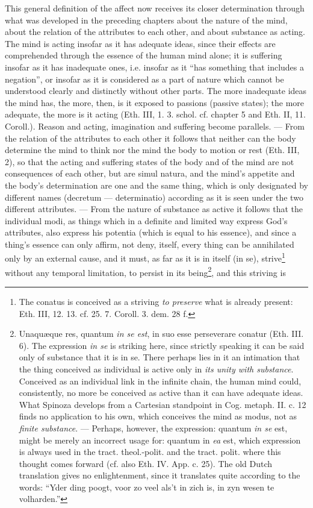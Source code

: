 \documentclass[12pt,a4paper,openany]{book}
\newcommand{\opage}[1]{\marginnote{\footnotesize\textit{[#1]}}}
\begin{document}
This general definition of the affect now receives its
closer determination through what was developed in the preceding chapters
about the nature of the mind, about the relation of the attributes
to each other, and about substance as acting. The mind
is acting insofar as it has adequate ideas, since
their effects are comprehended through the essence of the human
mind alone; it is suffering insofar as it has inadequate ones,
i.e. insofar as it ``has something that includes a negation'', or
insofar as it is considered as a part of nature which
cannot be understood clearly and distinctly without other parts. The
\opage{112}\setcounter{footnote}{0}more inadequate ideas the mind has, the more, then, is it
exposed to passions (passive states); the more adequate,
the more is it acting (Eth. III, 1. 3. schol. cf.
chapter 5 and Eth. II, 11. Coroll.). Reason and acting, imagination
and suffering become parallels. --- From the relation
of the attributes to each other it follows that neither can the body determine
the mind to think nor the mind the body to motion
or rest (Eth. III, 2), so that the acting and suffering states of the body
and of the mind are not consequences of each other,
but are simul natura, and the mind's appetite and the body's
determination are one and the same thing, which is only designated by
different names (decretum --- determinatio) according as it
is seen under the two different attributes. --- From the nature of
substance as active it follows that the individual modi, as things which
in a definite and limited way express God's
attributes, also express his potentia (which is equal to his
essence), and since a thing's essence can only affirm, not
deny, itself, every thing can be annihilated only by
an external cause, and it must, as far as it is in itself (in se),
strive\footnote{The conatus is conceived as a striving \emph{to
preserve} what is already present: Eth. III, 12. 13. cf.
25. 7. Coroll. 3. dem. 28 f.} without any temporal limitation, to %
persist in its
being\footnote{Unaquæque res, quantum \emph{in se est}, in
suo esse perseverare conatur (Eth. III. 6). The expression \emph{in
se} is striking here, since strictly speaking it can be said only of
substance that it is in se. There perhaps lies in it an
intimation that the thing conceived as individual is active only in \emph{its
unity with substance}. Conceived as an individual link in
the infinite chain, the human mind could, consistently,
no more be conceived as active than it can have
adequate ideas. What Spinoza develops from a Cartesian standpoint
in Cog. metaph. II. c. 12 finds no application to
his own, which conceives the mind as modus, not as
\emph{finite substance}. --- Perhaps, however, the expression:
quantum \emph{in se} est, might be merely an incorrect usage for:
quantum in \emph{ea} est, which expression is always used in the tract.
theol.-polit. and the tract. polit. where this thought comes forward
(cf. also Eth. IV. App. c. 25). The old Dutch
translation gives no enlightenment, since it translates
quite according to the words: ``Yder ding poogt, voor zo veel als't in
zich is, in zyn wesen te volharden.''}, and this striving is %
\end{document}
